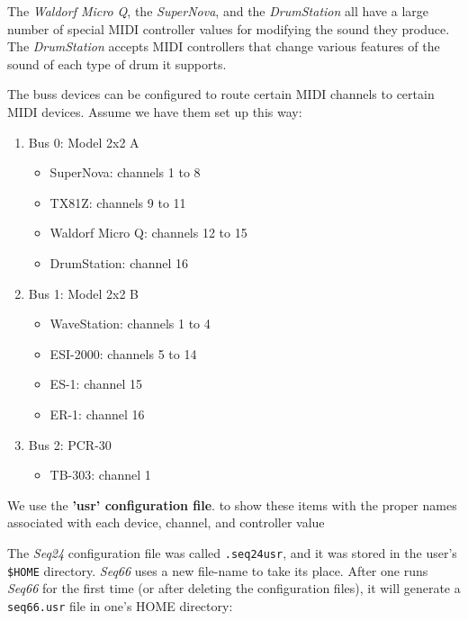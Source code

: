    The \textsl{Waldorf Micro Q},
   the \textsl{SuperNova},
   and the \textsl{DrumStation} all have a large
   number of special MIDI controller values for modifying the sound they
   produce.
   The \textsl{DrumStation} accepts MIDI controllers that change various
   features of the sound of each type of drum it supports.

   The buss devices can be configured to route certain
   MIDI channels to certain MIDI devices.  Assume we have them
   set up this way:

   \begin{enumerate}
      \item Bus 0: Model 2x2 A
      \begin{itemize}
         \item SuperNova: channels 1 to 8
         \item TX81Z: channels 9 to 11
         \item Waldorf Micro Q: channels 12 to 15
         \item DrumStation: channel 16
      \end{itemize}
      \item Bus 1: Model 2x2 B
      \begin{itemize}
         \item WaveStation: channels 1 to 4
         \item ESI-2000: channels 5 to 14
         \item ES-1: channel 15
         \item ER-1: channel 16
      \end{itemize}
      \item Bus 2: PCR-30
      \begin{itemize}
         \item TB-303: channel 1
      \end{itemize}
   \end{enumerate}

   We use the \textbf{'usr' configuration file}.
   to show these items with the proper
   names associated with each device, channel, and controller value

   The \textsl{Seq24} configuration file was called
   \texttt{.seq24usr}, and it was stored in the user's \texttt{\$HOME}
   directory.
   \textsl{Seq66} uses a new file-name
   to take its place.
   After one runs \textsl{Seq66} for the first time (or after deleting
   the configuration files), it will generate a
   \texttt{seq66.usr} file in one's HOME directory:

